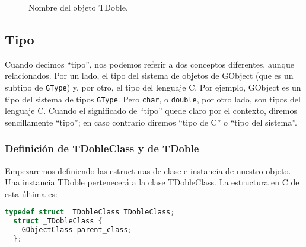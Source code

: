 \begin{figure}[ht]
  \centering
  \def\scl{1.4}
\caption{Nombre del objeto \textsf{TDoble}.}
\label{fig:nombre-objetos}
\end{figure}

\subsection{Tipo}
Cuando decimos ``tipo'', nos podemos referir a dos conceptos diferentes, aunque relacionados.
Por un lado, el tipo del sistema de objetos de \textsf{GObject} (que es un subtipo de \texttt{GType}) y,
por otro, el tipo del lenguaje C. Por ejemplo, \textsf{GObject} es un tipo del sistema de tipos \texttt{GType}.
Pero \texttt{char}, o \texttt{double}, por otro lado, son tipos del lenguaje C.
Cuando el significado de ``tipo'' quede claro por el contexto, diremos sencillamente ``tipo''; en caso contrario
diremos ``tipo de C'' o ``tipo del sistema''.

\subsubsection{Definición de \textsf{TDobleClass} y de \textsf{TDoble}}
Empezaremos definiendo las estructuras de clase e instancia de nuestro objeto.
Una instancia \textsf{TDoble} pertenecerá a la clase \textsf{TDobleClass}. La estructura en C de esta última es:
\begin{lstlisting}[language=C]
  typedef struct _TDobleClass TDobleClass;
  struct _TDobleClass {
    GObjectClass parent_class;
  };
\end{lstlisting}

